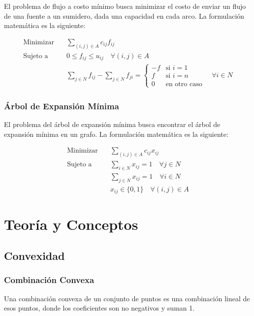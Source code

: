 \documentclass{article}
\begin{document}
El problema de flujo a costo mínimo busca minimizar el costo de enviar un flujo de una fuente a un sumidero, dada una capacidad en cada arco. La formulación matemática es la siguiente:

\begin{align*}
    \text{Minimizar} \quad & \sum_{(i, j) \in A} c_{ij} f_{ij} \\
    \text{Sujeto a} \quad & 0 \leq f_{ij} \leq u_{ij} \quad \forall (i, j) \in A \\
    & \sum_{j \in N} f_{ij} - \sum_{j \in N} f_{ji} = 
    \begin{cases}
        -f & \text{si } i = 1 \\
        f & \text{si } i = n \\
        0 & \text{en otro caso}
    \end{cases} \quad \forall i \in N
\end{align*}
\subsubsection{Árbol de Expansión Mínima}

El problema del árbol de expansión mínima busca encontrar el árbol de expansión mínima en un grafo. La formulación matemática es la siguiente:

\begin{align*}
    \text{Minimizar} \quad & \sum_{(i, j) \in A} c_{ij} x_{ij} \\
    \text{Sujeto a} \quad & \sum_{i \in N} x_{ij} = 1 \quad \forall j \in N \\
    & \sum_{j \in N} x_{ij} = 1 \quad \forall i \in N \\
    & x_{ij} \in \{0, 1\} \quad \forall (i, j) \in A
\end{align*}

\section{Teoría y Conceptos}

\subsection{Convexidad}

\subsubsection{Combinación Convexa}

Una combinación convexa de un conjunto de puntos es una combinación lineal de esos puntos, donde los coeficientes son no negativos y suman 1.
\end{document}
